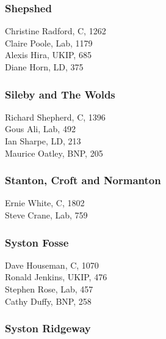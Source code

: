 \documentclass[a4paper,openany,10pt]{book}
\begin{document}
\subsubsection*{Shepshed}



Christine Radford, C, 1262\\
Claire Poole, Lab, 1179\\
Alexis Hira, UKIP, 685\\
Diane Horn, LD, 375\\


\subsubsection*{Sileby and The Wolds}



Richard Shepherd, C, 1396\\
Gous Ali, Lab, 492\\
Ian Sharpe, LD, 213\\
Maurice Oatley, BNP, 205\\


\subsubsection*{Stanton, Croft and Normanton}



Ernie White, C, 1802\\
Steve Crane, Lab, 759\\


\subsubsection*{Syston Fosse}



Dave Houseman, C, 1070\\
Ronald Jenkins, UKIP, 476\\
Stephen Rose, Lab, 457\\
Cathy Duffy, BNP, 258\\


\subsubsection*{Syston Ridgeway}
\end{document}
